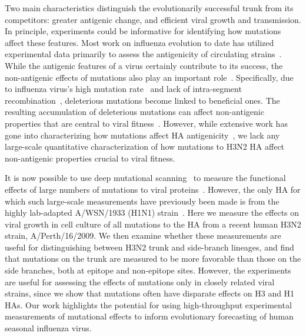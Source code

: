 \documentclass[9pt,twocolumn,twoside]{pnas-new}
\begin{document}
Two main characteristics distinguish the evolutionarily successful trunk from its competitors: greater antigenic change, and efficient viral growth and transmission.
In principle, experiments could be informative for identifying how mutations affect these features.
Most work on influenza evolution to date has utilized experimental data primarily to assess the antigenicity of circulating strains~\cite{sun2013using,harvey2016identification,neher2016prediction}.
While the antigenic features of a virus certainly contribute to its success, the non-antigenic effects of mutations also play an important role~\cite{pybus2007phylogenetic,strelkowa2012clonal,luksza2014predictive,koelle2015effects}.
Specifically, due to influenza virus's high mutation rate~\cite{holland1982rapid,steinhauer1987rapid,lauring2010quasispecies} and lack of intra-segment recombination~\cite{boni2008homologous}, deleterious mutations become linked to beneficial ones.
The resulting accumulation of deleterious mutations can affect non-antigenic properties that are central to viral fitness~\cite{luksza2014predictive}.
However, while extensive work has gone into characterizing how mutations affect HA antigenicity~\cite{laver1979antigenic, webster1980determination,wiley1981structural,koel2013substitutions,chambers2015identification,li2016selection}, we lack any large-scale quantitative characterization of how mutations to H3N2 HA affect non-antigenic properties crucial to viral fitness.

It is now possible to use deep mutational scanning~\cite{fowler2014deep} to measure the functional effects of large numbers of mutations to viral proteins~\cite{thyagarajan2014inherent,wu2014high,doud2016accurate,haddox2016experimental,qi2015high}.
However, the only HA for which such large-scale measurements have previously been made is from the highly lab-adapted A/WSN/1933 (H1N1) strain~\cite{thyagarajan2014inherent,wu2014high,doud2016accurate}.
Here we measure the effects on viral growth in cell culture of all mutations to the HA from a recent human H3N2 strain, A/Perth/16/2009.
We then examine whether these measurements are useful for distinguishing between H3N2 trunk and side-branch lineages, and find that mutations on the trunk are measured to be more favorable than those on the side branches, both at epitope and non-epitope sites.
However, the experiments are useful for assessing the effects of mutations only in closely related viral strains, since we show that mutations often have disparate effects on H3 and H1 HAs.
Our work highlights the potential for using high-throughput experimental measurements of mutational effects to inform evolutionary forecasting of human seasonal influenza virus.
\end{document}
